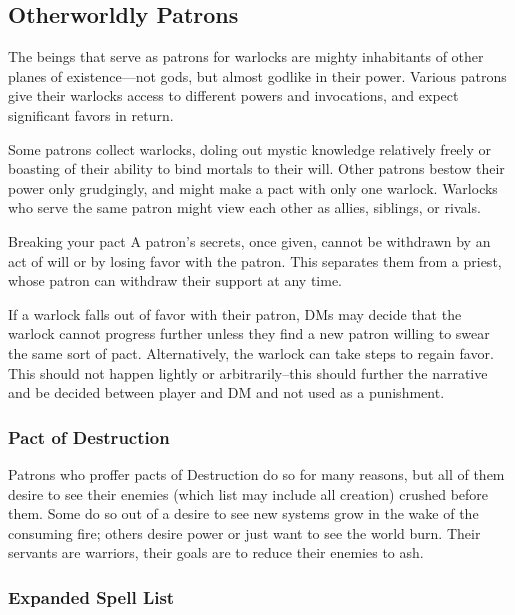 \subsection{Otherworldly Patrons}

The beings that serve as patrons for warlocks are mighty inhabitants of other planes of existence—not gods, but almost godlike in their power. Various patrons give their warlocks access to different powers and invocations, and expect significant favors in return.

Some patrons collect warlocks, doling out mystic knowledge relatively freely or boasting of their ability to bind mortals to their will. Other patrons bestow their power only grudgingly, and might make a pact with only one warlock. Warlocks who serve the same patron might view each other as allies, siblings, or rivals.

\begin{DndComment}{Breaking your pact}
	A patron's secrets, once given, cannot be withdrawn by an act of will or by losing favor with the patron. This separates them from a priest, whose patron can withdraw their support at any time.

	If a warlock falls out of favor with their patron, DMs may decide that the warlock cannot progress further unless they find a new patron willing to swear the same sort of pact. Alternatively, the warlock can take steps to regain favor. This should not happen lightly or arbitrarily--this should further the narrative and be decided between player and DM and not used as a punishment.
\end{DndComment}

\subsubsection{Pact of Destruction}

Patrons who proffer pacts of Destruction do so for many reasons, but all of them desire to see their enemies (which list may include all creation) crushed before them. Some do so out of a desire to see new systems grow in the wake of the consuming fire; others desire power or just want to see the world burn. Their servants are warriors, their goals are to reduce their enemies to ash.

\subsubsection{Expanded Spell List}

